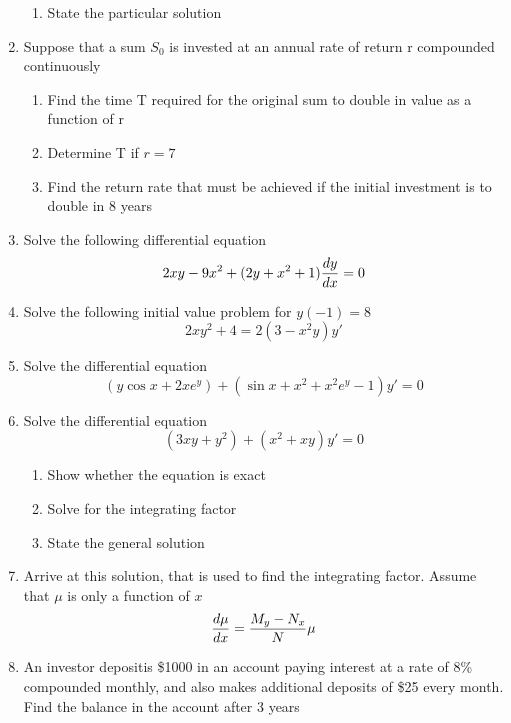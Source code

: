 \begin{multicols*}{2}
\begin{enumerate}
\begin{enumerate}
			\item State the particular solution 
		\end{enumerate}
		\item Suppose that a sum $S_0$ is invested at an annual rate of return r compounded 	continuously 
		\begin{enumerate}
			\item Find the time T required for the original sum to double in value as a function of r
			\item Determine T if $r = 7$
			\item Find the return rate that must be achieved if the initial investment is to double in 8 years 
		\end{enumerate}
		\item Solve the following differential equation
		$$ 2xy - 9x^2 + (2y + x^2 + 1) \dfrac{d y}{d x} = 0 $$
		\item Solve the following initial value problem for $y(-1) = 8$
		$$2xy^2+4=2(3-x^2y)y'$$
		\item Solve the differential equation 
		$$(y\cos x + 2xe^y) + (\sin x + x^2 + x^2e^y-1)y' = 0 $$
		\item Solve the differential equation 
		$$ (3xy+y^2) + (x^2+xy)y' = 0$$
		\begin{enumerate}
			\item Show whether the equation is exact
			\item Solve for the integrating factor
			\item State the general solution
		\end{enumerate}
		\item Arrive at this solution, that is used to find the integrating factor. Assume that $\mu$ is only a function of $x$
		$$\dfrac{d \mu}{d x} = \dfrac{M_y-N_x}{N} \mu$$
		\item An investor depositis \$1000 in an account paying interest at a rate of 8\% compounded monthly, and also makes additional deposits of \$25 every month. Find the balance in the account after 3 years
	\end{enumerate}
\end{multicols*}
